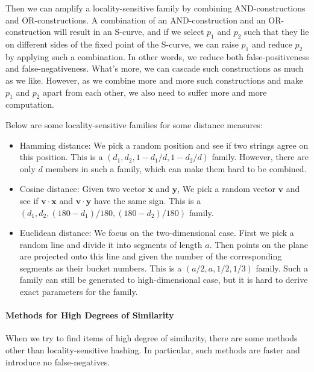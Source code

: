 \documentclass{article}
\begin{document}
Then we can amplify a locality-sensitive family by combining AND-constructions and OR-constructions. A combination of an AND-construction and an OR-construction will result in an S-curve, and if we select $p_1$ and $p_2$ such that they lie on different sides of the fixed point of the S-curve, we can raise $p_1$ and reduce $p_2$ by applying such a combination. In other words, we reduce both false-positiveness and false-negativeness. What's more, we can cascade such constructions as much as we like. However, as we combine more and more such constructions and make $p_1$ and $p_2$ apart from each other, we also need to suffer more and more computation.

Below are some locality-sensitive families for some distance measures:
\begin{itemize}
\item Hamming distance: We pick a random position and see if two strings agree on this position. This is a $(d_1,d_2,1-d_1/d,1-d_2/d)$ family. However, there are only $d$ members in such a family, which can make them hard to be combined.
\item Cosine distance: Given two vector $\mathbf{x}$ and $\mathbf{y}$, We pick a random vector $\mathbf{v}$ and see if $\mathbf{v}\cdot\mathbf{x}$ and $\mathbf{v}\cdot\mathbf{y}$ have the same sign. This is a $(d_1,d_2,(180-d_1)/180,(180-d_2)/180)$ family.
\item Euclidean distance: We focus on the two-dimensional case. First we pick a random line and divide it into segments of length $a$. Then points on the plane are projected onto this line and given the number of the corresponding segments as their bucket numbers. This is a $(a/2,a,1/2,1/3)$ family. Such a family can still be generated to high-dimensional case, but it is hard to derive exact parameters for the family.
\end{itemize}

\paragraph{Methods for High Degrees of Similarity}
When we try to find items of high degree of similarity, there are some methods other than locality-sensitive hashing. In particular, such methods are faster and introduce no false-negatives.
\end{document}
